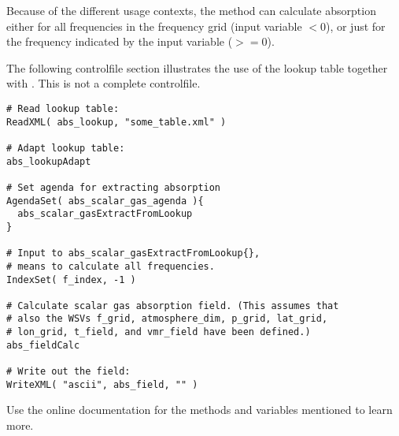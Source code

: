 Because of the different usage contexts, the method
 can calculate absorption
either for all frequencies in the frequency grid (input variable
$<$0), or just for the frequency indicated by the
input variable  ($>=$0).

The following controlfile section illustrates the use of the lookup
table together with . This is
not a complete controlfile. 

\begin{lstlisting}
# Read lookup table:
ReadXML( abs_lookup, "some_table.xml" )

# Adapt lookup table:
abs_lookupAdapt

# Set agenda for extracting absorption
AgendaSet( abs_scalar_gas_agenda ){
  abs_scalar_gasExtractFromLookup
}

# Input to abs_scalar_gasExtractFromLookup{}, 
# means to calculate all frequencies.
IndexSet( f_index, -1 )

# Calculate scalar gas absorption field. (This assumes that 
# also the WSVs f_grid, atmosphere_dim, p_grid, lat_grid, 
# lon_grid, t_field, and vmr_field have been defined.)
abs_fieldCalc

# Write out the field:
WriteXML( "ascii", abs_field, "" )
\end{lstlisting}

Use the online documentation for the methods and variables mentioned
to learn more.


